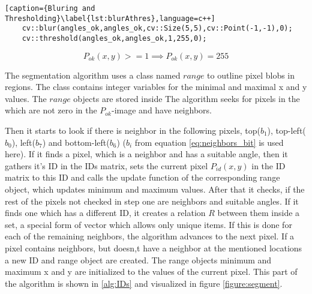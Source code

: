 \begin{lstlisting}[caption={Bluring and Thresholding}\label{lst:blurAthres},language=c++]
	cv::blur(angles_ok,angles_ok,cv::Size(5,5),cv::Point(-1,-1),0);
	cv::threshold(angles_ok,angles_ok,1,255,0);
\end{lstlisting}

\begin{equation}
	P_{ok}(x,y)>=1 \implies P_{ok}(x,y)=255
	\label{eq:thresholdSeg}
\end{equation}


The segmentation algorithm uses a class named $range$ to outline pixel blobs in regions. The class contains integer 
variables for the minimal and maximal x and y values. The $range$ objects are stored inside  The algorithm seeks for pixels in the 
which are not zero in the $P_{ok}$-image and have neighbors.

Then it starts to look if there is neighbor in the following pixels, top($b_1$), top-left($b_0$), 
left($b_7$) and bottom-left($b_6$) ($b_i$ from equation \vref{eq:neighbors_bit} is used here).
If it finds a pixel, which is a neighbor and has a suitable angle, then it gathers it's ID in the IDs matrix, 
sets the current pixel $P_{id}(x,y)$ in the ID matrix to this ID and calls the update function of the corresponding range object, 
which updates minimum and maximum values. After that it checks, if the rest of the pixels not checked in step one are 
neighbors and suitable angles. If it finds one which has a different ID, it creates a relation $R$ between 
them inside a set, a special form of vector which allows only unique items. If this is done for each of the remaining 
neighbors, the algorithm advances to the next pixel. If a pixel contains neighbors, but doesn,t have a neighbor at the 
mentioned locations a new ID and range object are created. The range objects minimum and maximum x and y are initialized 
to the values of the current pixel. This part of the algorithm is shown in \vref{alg:IDs} 
and visualized in figure \vref{figure:segment}.

